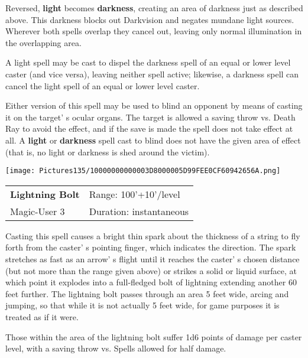 \documentclass[a4paper,twoside,openany,10pt]{book}
\begin{document}
\begin{multicols}{2}
Reversed, \textbf{light} becomes \textbf{darkness}, creating an area of darkness just as described above. This darkness blocks out Darkvision and negates mundane light sources. Wherever both spells overlap they cancel out, leaving only normal illumination in the overlapping area. 

A light spell may be cast to dispel the darkness spell of an equal or lower level caster (and vice versa), leaving neither spell active; likewise, a darkness spell can cancel the light spell of an equal or lower level caster.

Either version of this spell may be used to blind an opponent by means of casting it on the target' s ocular organs. The target is allowed a saving throw vs. Death Ray to avoid the effect, and if the save is made the spell does not take effect at all. A \textbf{light} or \textbf{darkness} spell cast to blind does not have the given area of effect (that is, no light or darkness is shed around the victim).

\medskip

\begin{flushleft}
\texttt{[image: Pictures135/10000000000003D8000005D99FEE0CF60942656A.png]}
\end{flushleft}

\smallskip\begin{flushleft} 
	\begin{tabularx}{0.45\textwidth}{@{}m{3.5cm}m{5.5cm}@{}} 
		\textbf{Lightning Bolt} & Range: 100'+10'/level\\
Magic-User 3 &Duration: instantaneous\\
	\end{tabularx}\end{flushleft}

Casting this spell causes a bright thin spark about the thickness of a string to fly forth from the caster' s pointing finger, which indicates the direction. The spark stretches as fast as an arrow' s flight until it reaches the caster' s chosen distance (but not more than the range given above) or strikes a solid or liquid surface, at which point it explodes into a full-fledged bolt of lightning extending another 60 feet further. The lightning bolt passes through an area 5 feet wide, arcing and jumping, so that while it is not actually 5 feet wide, for game purposes it is treated as if it were.

Those within the area of the lightning bolt suffer 1d6 points of damage per caster level, with a saving throw vs. Spells allowed for half damage.


\end{multicols}
\end{document}
